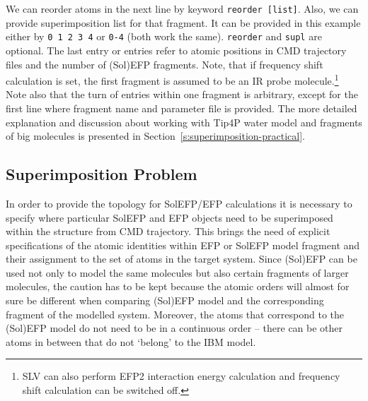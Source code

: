 \documentclass[a4paper,titlepage,twoside,fleqn,12pt]{book}
\begin{document}
\begin{refsection}
We can reorder atoms in the next line
by keyword {\tt reorder [list]}. Also, we can provide 
superimposition list for that fragment. It can be
provided in this example either by {\tt 0 1 2 3 4} 
or {\tt 0-4} (both work the same). {\tt reorder} and {\tt supl} are
optional. The last entry or entries refer to atomic positions in CMD trajectory 
files and the number of
(Sol)EFP fragments. Note, that if frequency shift calculation is set, the first fragment
is assumed to be an IR probe molecule.\footnote{SLV can also perform
EFP2 interaction energy calculation and frequency shift calculation
can be switched off.} 
Note also that the turn of entries within one fragment is
arbitrary, except for the first line where fragment name and parameter file is provided. The more
detailed explanation and discussion about working with Tip4P water model and fragments of big
molecules is presented in Section~\ref{s:superimposition-practical}.



\subsection{Superimposition Problem\label{s:superimposition-practical}}

In order to provide the topology for SolEFP/EFP calculations it is necessary to specify where particular
SolEFP and EFP objects need to be superimposed within the structure from CMD trajectory. This brings
the need of explicit specifications of the atomic identities within EFP or SolEFP model fragment and their
assignment to the set of atoms in the target system. Since (Sol)EFP can be used not only to model
the same molecules but also certain fragments of larger molecules, the caution has to be kept because
the atomic orders will almost for sure be different when comparing (Sol)EFP model and the
corresponding fragment of the modelled system. Moreover, the atoms that correspond to the
(Sol)EFP model do not need to be in a continuous order -- there can be other atoms in between that
do not `belong' to the IBM model.


\end{refsection}
\end{document}
